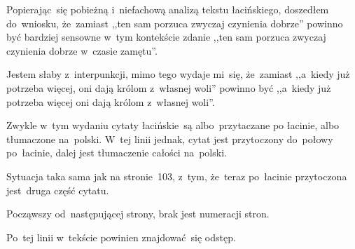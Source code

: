 \documentclass[a4paper,11pt]{article}
\begin{document}
\start {} Popierając~się pobieżną i~niefachową analizą
tekstu łacińskiego, doszedłem do~wniosku, że~zamiast ,,ten sam porzuca
zwyczaj czynienia dobrze'' powinno być bardziej sensowne w~tym
kontekście zdanie ,,ten sam porzuca zwyczaj czynienia dobrze w~czasie
zamętu''.

\vspace{\spaceFour}


\start {} Jestem słaby z~interpunkcji, mimo tego wydaje
mi~się, że~zamiast ,,a~kiedy już potrzeba więcej, oni dają królom
z~własnej woli'' powinno być ,,a~kiedy już potrzeba więcej oni dają
królom z~własnej woli''.

\vspace{\spaceFour}


\start {} Zwykle w~tym wydaniu cytaty łacińskie~są
albo~przytaczane po łacinie, albo tłumaczone na~polski. W~tej linii
jednak, cytat jest przytoczony do~połowy po~łacinie, dalej jest
tłumaczenie całości na~polski.

\vspace{\spaceFour}


\start {} Sytuacja taka sama jak na stronie~103, z~tym,
że~teraz po~łacinie przytoczona jest~druga część cytatu.

\vspace{\spaceFour}


\start {} Począwszy od~następującej strony, brak jest numeracji
stron.

\vspace{\spaceFour}


\start {} Po~tej linii w~tekście powinien znajdować~się odstęp.

\vspace{\spaceFour}
\end{document}
